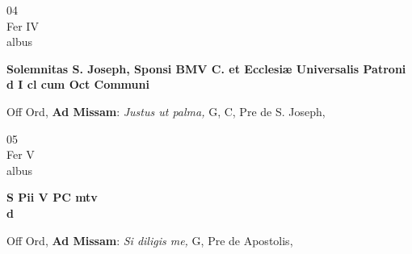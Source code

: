 \documentclass[10pt, openany]{book}
\begin{document}
        \begin{center}
            \begin{minipage}{3.5in}
                \vspace{2em}
                \begin{minipage}{0.5in}
                    {\Huge 04} \\
                    {\normalsize Fer IV} \\
                    {\normalsize albus}
                \end{minipage}
                \begin{minipage}{3.0in}
                    \textbf{ \large Solemnitas S. Joseph, Sponsi BMV C. et Ecclesiæ Universalis Patroni \\
                    \textnormal{\normalsize d I cl cum Oct Communi}} \\ 
                \end{minipage}
                \begin{justify}Off Ord, \textbf{Ad Missam}: \textit{Justus ut palma,} G, C, Pre de S. Joseph,   
                \end{justify}
            \end{minipage}
        \end{center}
    
        \begin{center}
            \begin{minipage}{3.5in}
                \vspace{2em}
                \begin{minipage}{0.5in}
                    {\Huge 05} \\
                    {\normalsize Fer V} \\
                    {\normalsize albus}
                \end{minipage}
                \begin{minipage}{3.0in}
                    \textbf{ \large S Pii V PC mtv \\
                    \textnormal{\normalsize d}} \\ 
                \end{minipage}
                \begin{justify}Off Ord, \textbf{Ad Missam}: \textit{Si diligis me,} G, Pre de Apostolis,   
                \end{justify}
            \end{minipage}
        \end{center}
    
\end{document}
